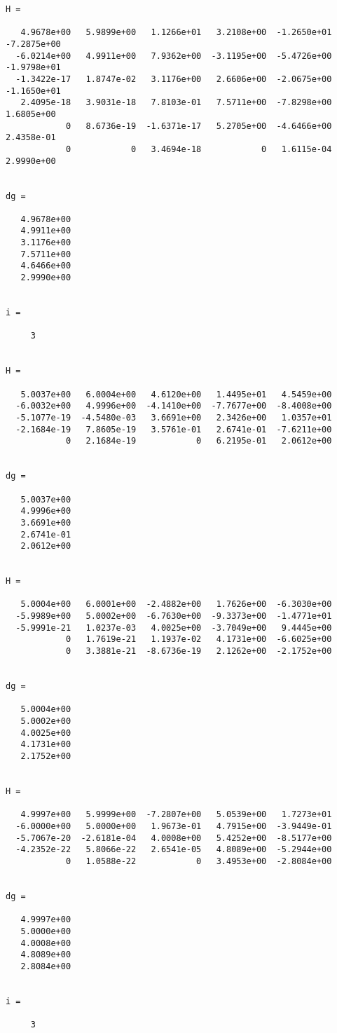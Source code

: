 \begin{verbatim}
H =

   4.9678e+00   5.9899e+00   1.1266e+01   3.2108e+00  -1.2650e+01  -7.2875e+00
  -6.0214e+00   4.9911e+00   7.9362e+00  -3.1195e+00  -5.4726e+00  -1.9798e+01
  -1.3422e-17   1.8747e-02   3.1176e+00   2.6606e+00  -2.0675e+00  -1.1650e+01
   2.4095e-18   3.9031e-18   7.8103e-01   7.5711e+00  -7.8298e+00   1.6805e+00
            0   8.6736e-19  -1.6371e-17   5.2705e+00  -4.6466e+00   2.4358e-01
            0            0   3.4694e-18            0   1.6115e-04   2.9990e+00


dg =

   4.9678e+00
   4.9911e+00
   3.1176e+00
   7.5711e+00
   4.6466e+00
   2.9990e+00


i =

     3


H =

   5.0037e+00   6.0004e+00   4.6120e+00   1.4495e+01   4.5459e+00
  -6.0032e+00   4.9996e+00  -4.1410e+00  -7.7677e+00  -8.4008e+00
  -5.1077e-19  -4.5480e-03   3.6691e+00   2.3426e+00   1.0357e+01
  -2.1684e-19   7.8605e-19   3.5761e-01   2.6741e-01  -7.6211e+00
            0   2.1684e-19            0   6.2195e-01   2.0612e+00


dg =

   5.0037e+00
   4.9996e+00
   3.6691e+00
   2.6741e-01
   2.0612e+00


H =

   5.0004e+00   6.0001e+00  -2.4882e+00   1.7626e+00  -6.3030e+00
  -5.9989e+00   5.0002e+00  -6.7630e+00  -9.3373e+00  -1.4771e+01
  -5.9991e-21   1.0237e-03   4.0025e+00  -3.7049e+00   9.4445e+00
            0   1.7619e-21   1.1937e-02   4.1731e+00  -6.6025e+00
            0   3.3881e-21  -8.6736e-19   2.1262e+00  -2.1752e+00


dg =

   5.0004e+00
   5.0002e+00
   4.0025e+00
   4.1731e+00
   2.1752e+00


H =

   4.9997e+00   5.9999e+00  -7.2807e+00   5.0539e+00   1.7273e+01
  -6.0000e+00   5.0000e+00   1.9673e-01   4.7915e+00  -3.9449e-01
  -5.7067e-20  -2.6181e-04   4.0008e+00   5.4252e+00  -8.5177e+00
  -4.2352e-22   5.8066e-22   2.6541e-05   4.8089e+00  -5.2944e+00
            0   1.0588e-22            0   3.4953e+00  -2.8084e+00


dg =

   4.9997e+00
   5.0000e+00
   4.0008e+00
   4.8089e+00
   2.8084e+00


i =

     3



\end{verbatim}
